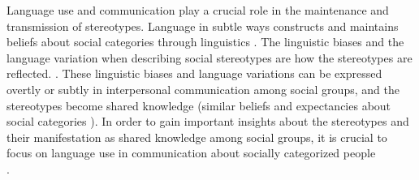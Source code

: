  Language use and communication play a crucial role in the maintenance and transmission of stereotypes. Language in subtle ways constructs and maintains beliefs about social categories through linguistics \cite{beukeboom2019stereotypes}.  The linguistic biases and the language variation when describing social stereotypes are how the stereotypes are reflected. \cite{burgers2020language}. These linguistic biases and language variations can be expressed overtly or subtly in interpersonal communication among social groups, and the stereotypes become shared knowledge (similar beliefs and expectancies about social categories \cite{beukeboom2019stereotypes}). In order to gain important insights about the stereotypes and their manifestation as shared knowledge among social groups, it is crucial to focus on language use in communication about socially categorized people 
 \\
 
 \cite{beukeboom2019stereotypes}.
 
 
 
 
 
 


